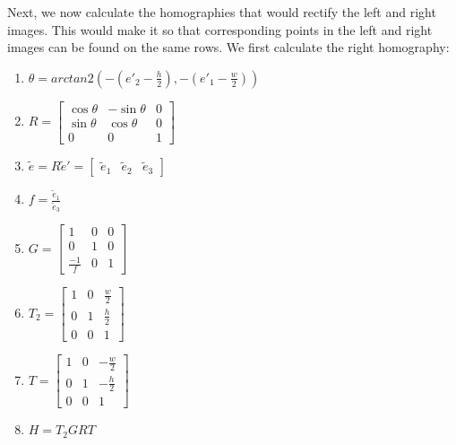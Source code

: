 \documentclass{article}
\begin{document}
Next, we now calculate the homographies that would rectify the left and right images. This would make it so that corresponding points
in the left and right images can be found on the same rows. We first calculate the right homography:
\begin{enumerate}
    \item \(\theta = arctan2(-\left(e'_2 - \frac{h}{2}\right), -\left(e'_1 - \frac{w}{2}\right))\)
    \item \(R = \begin{bmatrix}
                    \cos\theta & -\sin\theta & 0 \\
                    \sin\theta & \cos\theta & 0 \\
                    0 & 0 & 1
                \end{bmatrix}\)

    \item \(\tilde{e} = R \tilde{e}' = \begin{bmatrix} \tilde{e}_1 & \tilde{e}_2 & \tilde{e}_3 \end{bmatrix} \)
    \item \(f = \frac{\tilde{e}_1}{\tilde{e}_3} \)
                
    \item \(G = \begin{bmatrix}
                    1 & 0 & 0 \\
                    0 & 1 & 0 \\
                    \frac{-1}{f} & 0 & 1
                \end{bmatrix}\)
    \item \(T_2 = \begin{bmatrix}
                    1 & 0 & \frac{w}{2} \\
                    0 & 1 & \frac{h}{2} \\
                    0 & 0 & 1
                \end{bmatrix}\)
    \item \(T = \begin{bmatrix}
                    1 & 0 & -\frac{w}{2} \\
                    0 & 1 & -\frac{h}{2} \\
                    0 & 0 & 1
                \end{bmatrix}\)
    \item \( H = T_2 G R T \)
\end{enumerate}
\end{document}
